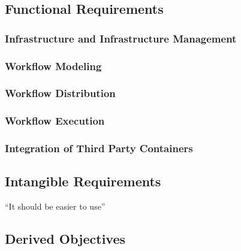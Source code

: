 
\subsection{Functional Requirements} %
  \label{sub:functional_requirements}

  \subsubsection{Infrastructure and Infrastructure Management} %
    \label{ssub:infrastructure_management}

  \subsubsection{Workflow Modeling} %
    \label{ssub:workflow_modeling}
  
  \subsubsection{Workflow Distribution} %
    \label{ssub:workflow_distribution}

  \subsubsection{Workflow Execution} %
    \label{ssub:workflow_execution}

  \subsubsection{Integration of Third Party Containers} %
    \label{ssub:integration_of_third_party_containers}

\subsection{Intangible Requirements} %
  \label{sub:intangible_requirements}
    ``It should be easier to use''

\subsection{Derived Objectives} %
  \label{sub:derived_objectives}
